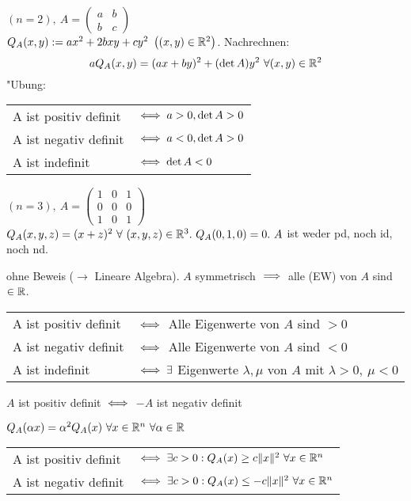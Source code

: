\documentclass[a4paper,twoside,DIV15,BCOR12mm,chapterprefix=true,headings=twolinechapter]{scrbook}
\begin{document}
\begin{beispiele}
\item $(n=2),\ A=\left(\begin{smallmatrix}a&b\\b&c\end{smallmatrix}\right)$\\
$Q_A(x,y):=ax^2+2bxy+cy^2\ \left((x,y)\in\MdR^2\right)$. Nachrechnen:\\
$$aQ_A(x,y)=(ax+by)^2+(\det A)y^2\ \forall (x,y)\in\mathbb{R}^2$$ "Ubung:\\
\begin{tabular}{ll}
A ist positiv definit & $\iff a>0, \det A>0$\\
A ist negativ definit & $\iff a<0, \det A>0$\\
A ist indefinit& $\iff \det A<0$
\end{tabular}
\item $(n=3),\ A=\left(\begin{smallmatrix}1&0&1\\0&0&0\\1&0&1\end{smallmatrix}\right)$\\
$Q_A(x,y,z)=(x+z)^2\ \forall\ (x,y,z)\in\MdR^3.\ Q_A(0,1,0)=0.\ A$ ist weder pd, noch id, noch nd.
\item ohne Beweis ($\to$ Lineare Algebra). $A$ symmetrisch $\implies$ alle  (EW) von $A$ sind $\in\mathbb{R}$.\\
\begin{tabular}{ll}
A ist positiv definit & $\iff$ Alle Eigenwerte von $A$ sind $>0$\\
A ist negativ definit & $\iff$ Alle Eigenwerte von $A$ sind $<0$\\
A ist indefinit& $\iff \exists$ Eigenwerte $\lambda, \mu$ von $A$ mit $\lambda>0,\ \mu<0$
\end{tabular}
\end{beispiele}

\begin{satz}
\begin{liste}
\item $A$ ist positiv definit $\iff$ $-A$ ist negativ definit
\item $Q_A(\alpha x)=\alpha^2Q_A(x)\ \forall x\in\mathbb{R}^n\ \forall \alpha\in\mathbb{R}$
\item \begin{tabular}{ll}
A ist positiv definit & $\iff \exists c>0: Q_A(x)\ge c\|x\|^2\ \forall x\in\mathbb{R}^n$\\
A ist negativ definit & $\iff \exists c>0: Q_A(x)\le -c\|x\|^2\ \forall x\in\mathbb{R}^n$
\end{tabular}
\end{liste}
\end{satz}
\end{document}
